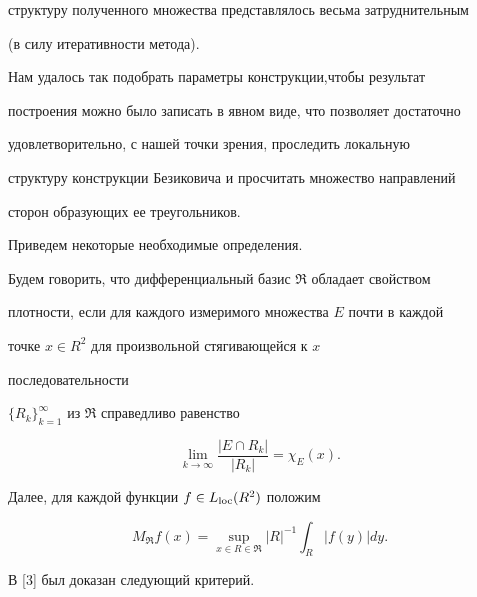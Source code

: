 структуру полученного множества представлялось весьма затруднительным 


(в силу итеративности метода). 


 


Нам удалось так подобрать параметры конструкции,чтобы результат 


построения можно было записать в явном виде, что позволяет достаточно 


удовлетворительно, с нашей точки зрения, проследить локальную 


структуру конструкции Безиковича и просчитать множество направлений 


сторон образующих ее треугольников. 


 


Приведем некоторые необходимые определения. 


Будем говорить, что дифференциальный базис $\Re$ обладает свойством 


плотности, если для каждого измеримого множества $E$ почти в каждой 


точке $x\in R^2$ для произвольной стягивающейся к $x$ 


последовательности 


$\{R_k\}^\infty_{k=1}$ из $\Re$ справедливо равенство 


$$ 


\lim_{k\to\infty}\frac{|E\cap R_k|}{|R_k|}=\chi_E(x). 


$$ 


 


Далее, для каждой функции $f\in L_{\operatorname{loc}} (R^2)$ положим 


$$ 


M_\Re f(x)=\sup_{x\in R\in \Re}|R|^{-1} 


\int_R |f(y)|dy. 


$$ 


 


В [3] был доказан следующий критерий. 


 


